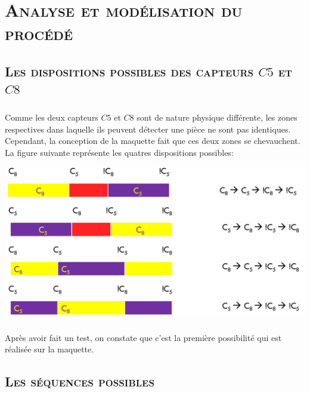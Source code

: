 \chapter{\textsc{Analyse et modélisation du procédé}}

	\section{\textsc{Les dispositions possibles des capteurs $C5$ et $C8$}}	
	\paragraph{} 
	Comme les deux capteurs $C5$ et $C8$ sont de nature physique différente, les zones respectives dans laquelle ils peuvent détecter une pièce ne sont pas identiques. Cependant, la conception de la maquette fait que ces deux zones se chevauchent. La figure suivante représente les quatres dispositions possibles:
	
	\begin{center}
	\includegraphics[scale=0.4]{c5.png}
	\label{fig2}
	\end{center} 

	\paragraph{} Après avoir fait un test, on constate que c'est la première possibilité qui est réalisée sur la maquette. 
	

	\section{\textsc{Les séquences possibles}}
	
